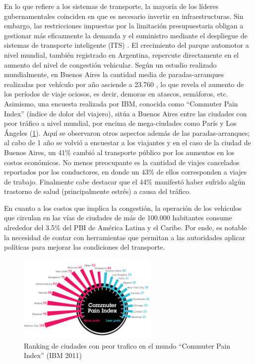 En lo que refiere a los sistemas de transporte, la mayoría de los líderes gubernamentales coinciden en que es necesario invertir en infraestructuras. Sin embargo, las restricciones impuestas por la limitación presupuestaria obligan a gestionar más eficazmente la demanda y el suministro mediante el despliegue de sistemas de transporte inteligente (ITS) \cite{transpinteligente2009}. 
El crecimiento del parque automotor a nivel mundial, también registrado en Argentina\cite{ondat2015}, repercute directamente en el aumento del nivel de congestión vehicular\cite{de1994modelling}. Según un estudio realizado mundialmente, en Buenos Aires la cantidad media de paradas-arranques realizadas por vehículo por año asciende a 23.760 \cite{castrol2014}, lo que revela el aumento de los períodos de viaje ociosos, es decir, demoras en atascos, semáforos, etc. Asimismo, una encuesta realizada por IBM, conocida como ``Commuter Pain Index'' (índice de dolor del viajero),  sitúa a Buenos Aires entre las ciudades con peor tráfico a nivel mundial, por encima de mega-ciudades como París y Los Ángeles (\ref{fig:commuter-pain-index}). Aquí se observaron otros aspectos además de las paradas-arranques;  al cabo de 1 año se volvió a encuestar a los viajantes y en el caso de la ciudad de Buenos Aires, un 41\% cambió al transporte público por los aumentos en los costos económicos. No menos preocupante es la cantidad de viajes cancelados reportados por los conductores, en donde un 43\% de ellos corresponden a viajes de trabajo. Finalmente cabe destacar que el 44\% manifestó haber sufrido algún trastorno de salud (principalmente estrés) a causa del tráfico.

En cuanto a los costos que implica la congestión, la operación de los vehículos que circulan en las vías de ciudades de más de 100.000 habitantes consume alrededor del 3.5\% del PBI de América Latina y el Caribe\cite{bull2003congestion}. Por ende, es notable la necesidad de contar con herramientas que permitan a las autoridades aplicar políticas para mejorar las condiciones del transporte.

\begin{figure}[!htp]
\centering
\includegraphics[width=0.6\textwidth]{images/commuter-pain-index.png}
\captionsetup{width=0.6\textwidth}
\caption{Ranking de ciudades con peor trafico en el mundo ``Commuter Pain Index'' (IBM 2011)}
\label{fig:commuter-pain-index}
\end{figure}

